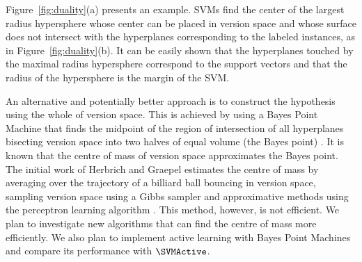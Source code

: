 Figure~\ref{fig:duality}(a) presents an example.
SVMs find the center of the largest radius hypersphere whose center
can be placed in version space and whose surface does not intersect
with the hyperplanes corresponding to the labeled instances, as in
Figure~\ref{fig:duality}(b). It can be easily shown that the
hyperplanes touched by the maximal radius hypersphere
correspond to the support vectors and that the radius of the
hypersphere is the margin of the SVM.

An alternative and potentially better approach is to construct the 
hypothesis using the whole of version space. This is achieved by using a 
Bayes Point Machine that finds the midpoint of the region of 
intersection of all 
hyperplanes bisecting version space into two halves of equal volume (the 
Bayes point) \cite{Herbrich+al,HG01,HGC01}. It is known that the centre of 
mass of version space 
approximates the Bayes point. The initial work of
Herbrich and Graepel estimates the centre of 
mass by averaging over the trajectory of a billiard 
ball bouncing in version space, sampling version space using a 
Gibbs sampler and approximative methods using the perceptron 
learning algorithm \cite{GH01}.
This method, however, is not efficient.
We plan to investigate new algorithms that can find the 
centre of mass more efficiently.  We also plan to
implement active learning with Bayes Point Machines and
compare its performance with $\SVMActive$.

